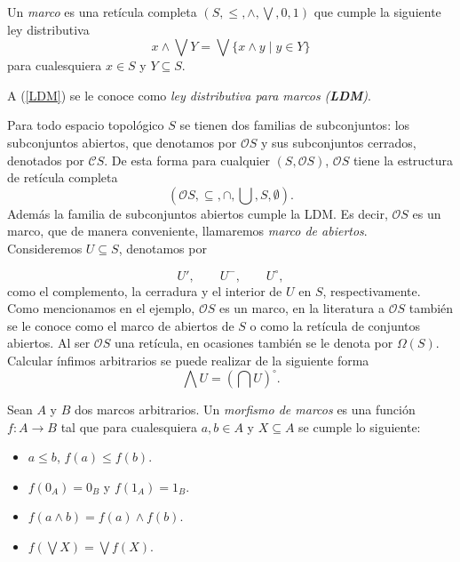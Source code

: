 \documentclass{comunicaciones}
\begin{document}
    \begin{dfn}\label{frm}
    Un \emph{marco} es una retícula completa $(S, \leq, \wedge, \bigvee, 0, 1)$ que cumple la siguiente ley distributiva 
    \begin{equation}\label{LDM}
    x\wedge\bigvee Y=\bigvee\{x\wedge y\mid y\in Y\}
    \end{equation}
    para cualesquiera $x\in S$ y $Y\subseteq S$.
    \end{dfn}
    
    A (\ref{LDM}) se le conoce como \emph{ley distributiva para marcos} \emph{(\textbf{LDM})}.

    \begin{ej}\label{ejem1}
    Para todo espacio topológico $S$ se tienen dos familias de subconjuntos: los subconjuntos abiertos, que denotamos por $\mathcal{O}S$ y sus subconjuntos cerrados, denotados por $\mathcal{C}S$. De esta forma para cualquier $(S,\mathcal{O}S)$, $\mathcal{O}S$ tiene la estructura  de retícula completa $$(\mathcal{O}S, \subseteq, \cap,\bigcup, S,\emptyset).$$
    Además la familia de subconjuntos abiertos cumple la LDM. Es decir, $\mathcal{O}S$ es un marco, que de manera conveniente, llamaremos \emph{marco de abiertos}.\\
    
    Consideremos $U\subseteq S$, denotamos por
    
    \[
    U',\qquad U^-,\qquad U^\circ,
    \]
    como el complemento, la cerradura y el interior de $U$ en $S$, respectivamente.\\ 
    
    Como mencionamos en el ejemplo, $\mathcal{O}S$ es un marco, en la literatura a $\mathcal{O}S$ también se le conoce como el marco de abiertos de $S$ o como la retícula de conjuntos abiertos. Al ser $\mathcal{O}S$ una retícula, en ocasiones también se le denota por $\Omega(S)$.\\
    
    Calcular ínfimos arbitrarios se puede realizar de la siguiente forma 
    \[
    \bigwedge U=\left(\bigcap U\right)^\circ.
    \]
    \end{ej}

    \begin{dfn}\label{morf}
        Sean $A$ y $B$ dos marcos arbitrarios. Un \emph{morfismo de marcos} es una función $f\colon A\rightarrow B$ tal que para cualesquiera $a,b\in A$ y $X\subseteq A$ se cumple lo siguiente:
        \begin{itemize}
        \item $a\leq b$, $f(a)\leq f(b)$.
        \item $f(0_A)=0_B$ y $f(1_A)=1_B$.
        \item $f(a\wedge b)= f(a)\wedge f(b)$.
        \item $f(\bigvee X)=\bigvee f(X)$.
        \end{itemize}
        \end{dfn}
        
\end{document}
